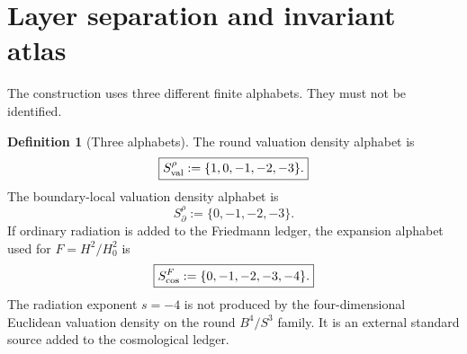 \documentclass[aps,prd,reprint,nofootinbib,superscriptaddress,floatfix]{revtex4-2}
\numberwithin{equation}{section}
\theoremstyle{definition}
\newtheorem{definition}{Definition}[section]
\theoremstyle{plain}
\begin{document}
\section{Layer separation and invariant atlas}\label{sec:atlas}

The construction uses three different finite alphabets.  They must not be identified.

\begin{definition}[Three alphabets]
The round valuation density alphabet is
\begin{equation}
\boxed{
S_{\rm val}^{\rho}:=\{1,0,-1,-2,-3\}.
}
\end{equation}
The boundary-local valuation density alphabet is
\begin{equation}
\boxed{
S_{\partial}^{\rho}:=\{0,-1,-2,-3\}.
}
\end{equation}
If ordinary radiation is added to the Friedmann ledger, the expansion alphabet used for \(F=H^2/H_0^2\) is
\begin{equation}
\boxed{
S_{\rm cos}^{F}:=\{0,-1,-2,-3,-4\}.
}
\end{equation}
The radiation exponent \(s=-4\) is not produced by the four-dimensional Euclidean valuation density on the round \(B^4/S^3\) family.  It is an external standard source added to the cosmological ledger.
\end{definition}
\end{document}
